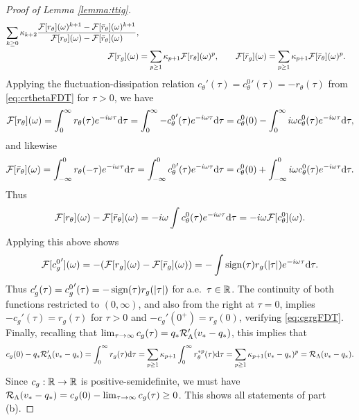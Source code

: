 \begin{proof}[Proof of Lemma \ref{lemma:ttig}]
\begin{equation}
\begin{aligned}
\sum_{k \geq 0} \kappa_{k+2} \frac{\mathcal{F}[r_\theta](\omega)^{k+1}
-\mathcal{F}[\bar r_\theta](\omega)^{k+1}}{\mathcal{F}[r_\theta](\omega)-\mathcal{F}[\bar r_\theta](\omega)},\\
\mathcal{F}[r_g](\omega)&=\sum_{p \geq 1} \kappa_{p+1}\mathcal{F}[r_\theta](\omega)^p,
\qquad \mathcal{F}[\bar r_g](\omega)=\sum_{p \geq 1} \kappa_{p+1}\mathcal{F}[\bar r_\theta](\omega)^p.
\end{aligned}
\end{equation}
Applying the fluctuation-dissipation relation
$c_\theta'(\tau)={c_\theta^0}'(\tau)={-}r_\theta(\tau)$ from \eqref{eq:crthetaFDT}
for $\tau>0$, we have
\[\mathcal{F}[r_\theta](\omega)=\int_0^\infty r_\theta(\tau)e^{-i\omega \tau}
\mathrm{d}\tau=\int_0^\infty {-}{c_\theta^0}'(\tau)e^{-i\omega \tau}
\mathrm{d}\tau=c_\theta^0(0)-\int_0^\infty i\omega c_\theta^0(\tau)e^{-i\omega \tau}
\mathrm{d} \tau,\]
and likewise
\[\mathcal{F}[\bar r_\theta](\omega)=\int_{-\infty}^0 r_\theta(-\tau)
e^{-i\omega\tau}\mathrm{d} \tau=\int_{-\infty}^0 {c_\theta^0}'(\tau)e^{-i\omega \tau}\mathrm{d} \tau
=c_\theta^0(0)+\int_{-\infty}^0 i\omega c_\theta^0(\tau)e^{-i\omega \tau}\mathrm{d} \tau.\]
Thus
\[\mathcal{F}[r_\theta](\omega)-\mathcal{F}[\bar r_\theta](\omega)
={-}i\omega \int c_\theta^0(\tau)e^{-i\omega \tau}\mathrm{d} \tau
={-}i\omega \mathcal{F}[c_\theta^0](\omega).\]
Applying this above shows
\[\mathcal{F}[{c_g^0}'](\omega)=-(\mathcal{F}[r_g](\omega)-\mathcal{F}[\bar r_g](\omega))
=-\int \operatorname{sign}(\tau)r_g(|\tau|) e^{-i\omega\tau} \mathrm{d} \tau.\]
Thus $c_g'(\tau)={c_g^0}'(\tau)={-}\operatorname{sign}(\tau)r_g(|\tau|)$ for a.e.\ $\tau \in \mathbb{R}$.
The continuity of both functions restricted to $(0,\infty)$, and also
from the right at $\tau=0$, implies ${-}c_g'(\tau)=r_g(\tau)$ for $\tau>0$ and
${-}c_g'(0^+)=r_g(0)$, verifying \eqref{eq:cgrgFDT}. Finally, 
recalling that $\lim_{\tau \to \infty} c_g(\tau)=q_*\mathcal{R}_\Lambda'(v_*-q_*)$,
this implies that
\[c_g(0)-q_*\mathcal{R}_\Lambda'(v_*-q_*)=\int_0^\infty r_g(\tau) \mathrm{d} \tau
=\sum_{p \geq 1} \kappa_{p+1} \int_0^\infty r_\theta^{*p}(\tau) \mathrm{d} \tau
=\sum_{p \geq 1} \kappa_{p+1} (v_*-q_*)^p=\mathcal{R}_\Lambda(v_*-q_*).\]
Since $c_g:\mathbb{R} \to \mathbb{R}$ is positive-semidefinite, we must have
$\mathcal{R}_\Lambda(v_*-q_*)=c_g(0)-\lim_{\tau \to \infty} c_g(\tau) \geq 0$.
This shows all statements of part (b).
\end{proof}
